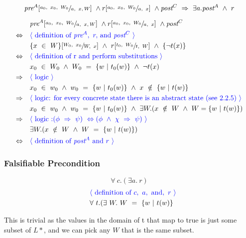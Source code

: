 \documentclass[a4paper, fleqn]{article}
\newcommand{\reason}[1]{\text{\textcolor{blue}{$\langle$ #1 $\rangle$}}}
\begin{document}
 $$ \textit{pre}^A[\sfrac{a_0,\ x_0, \ W_0}{a,\ x, W}]\ \land r[\sfrac{a_0,\ x_0, \ W_0}{a,\ x}]\ \land \textit{post}^{C}\ \Rightarrow\ \exists a.\textit{post}^A\ \land\ r$$

\begin{align*}
		&\quad\textit{pre}^A[\sfrac{a_0,\ x_0, \ W_0}{a,\ x, W}]\ \land r[\sfrac{a_0,\ x_0, \ W_0}{a,\ x}]\ \land \textit{post}^{C}\\
		\Leftrightarrow&\quad\reason{definition of $\textit{pre}^A,\ r,$ and $\textit{post}^C$} \\
		&\quad\{x\ \in\ W\}[\sfrac{W_0,\ x_0}{W,\ x}]\ \land\ r[\sfrac{t_0,\ W_0}{t,\ W}]\ \land\ \{\neg t(x)\}\\
		\Leftrightarrow&\quad\reason{definition of r and perform substitutions} \\
		&\quad x_0\ \in\ W_0\ \land\ W_0\ =\ \{w\ |\ t_0(w)\}\ \land\ \neg t(x) \\
		\Rightarrow&\quad\reason{logic} \\
		&\quad x_0\ \in \ w_0\ \land\ w_0\ =\ \{w\ |\ t_0(w)\}\ \land\ x\ \notin\ \{w\ |\ t(w)\} \\
		\Rightarrow&\quad\reason{logic: for every concrete state there is an abstract state (see 2.2.5)} \\
		&\quad x_0\ \in \ w_0\ \land\ w_0\ =\ \{w\ |\ t_0(w)\}\ \land\ \exists W.(x\ \notin\ W\ \land\ W = \{w\ |\ t(w)\}) \\
		\Rightarrow&\quad\reason{logic :$(\phi\ \Rightarrow\ \psi)\ \Leftrightarrow (\phi\ \land\ \chi\ \Rightarrow\ \psi)$} \\
		&\quad \exists W.(x\ \notin\ W\ \land\ W\ =\ \{w\ |\ t(w)\}) \\  
		\Leftrightarrow&\quad\reason{definition of $\textit{post}^A$ and $r$}
\end{align*}
 

\subsubsection{Falsifiable Precondition}
$$\forall\ c.(\exists a.\ r)$$
\begin{align*}
		&\quad\reason{definition of $c,\ a,\ \text{and},\ r$} \\
		&\quad\forall\ t.(\exists\ W.\ W\ =\ \{w\ |\ t(w)\} \\ 
\end{align*}

This is trivial as the values in the domain of t that map to true is just some subset of $L*$, and we can pick any $W$ that is the same subset.
\end{document}
